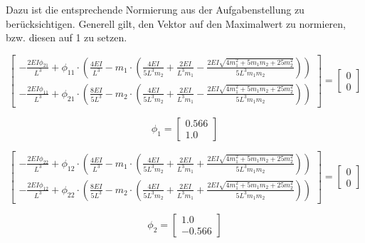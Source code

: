\documentclass[
  letterpaper,
  DIV=11]{scrreprt}
\begin{document}
Dazu ist die entsprechende Normierung aus der Aufgabenstellung zu
berücksichtigen. Generell gilt, den Vektor auf den Maximalwert zu
normieren, bzw. diesen auf 1 zu setzen.

\begin{equation}\left[\begin{matrix}- \frac{2 EI \phi_{21}}{L^{3}} + \phi_{11} \cdot \left(\frac{4 EI}{L^{3}} - m_{1} \cdot \left(\frac{4 EI}{5 L^{3} m_{2}} + \frac{2 EI}{L^{3} m_{1}} - \frac{2 EI \sqrt{4 m_{1}^{2} + 5 m_{1} m_{2} + 25 m_{2}^{2}}}{5 L^{3} m_{1} m_{2}}\right)\right)\\- \frac{2 EI \phi_{11}}{L^{3}} + \phi_{21} \cdot \left(\frac{8 EI}{5 L^{3}} - m_{2} \cdot \left(\frac{4 EI}{5 L^{3} m_{2}} + \frac{2 EI}{L^{3} m_{1}} - \frac{2 EI \sqrt{4 m_{1}^{2} + 5 m_{1} m_{2} + 25 m_{2}^{2}}}{5 L^{3} m_{1} m_{2}}\right)\right)\end{matrix}\right] = \left[\begin{matrix}0\\0\end{matrix}\right]\end{equation}

\begin{equation}\phi_{1} = \left[\begin{matrix}0.566\\1.0\end{matrix}\right]\end{equation}

\begin{equation}\left[\begin{matrix}- \frac{2 EI \phi_{22}}{L^{3}} + \phi_{12} \cdot \left(\frac{4 EI}{L^{3}} - m_{1} \cdot \left(\frac{4 EI}{5 L^{3} m_{2}} + \frac{2 EI}{L^{3} m_{1}} + \frac{2 EI \sqrt{4 m_{1}^{2} + 5 m_{1} m_{2} + 25 m_{2}^{2}}}{5 L^{3} m_{1} m_{2}}\right)\right)\\- \frac{2 EI \phi_{12}}{L^{3}} + \phi_{22} \cdot \left(\frac{8 EI}{5 L^{3}} - m_{2} \cdot \left(\frac{4 EI}{5 L^{3} m_{2}} + \frac{2 EI}{L^{3} m_{1}} + \frac{2 EI \sqrt{4 m_{1}^{2} + 5 m_{1} m_{2} + 25 m_{2}^{2}}}{5 L^{3} m_{1} m_{2}}\right)\right)\end{matrix}\right] = \left[\begin{matrix}0\\0\end{matrix}\right]\end{equation}

\begin{equation}\phi_{2} = \left[\begin{matrix}1.0\\-0.566\end{matrix}\right]\end{equation}
\end{document}
